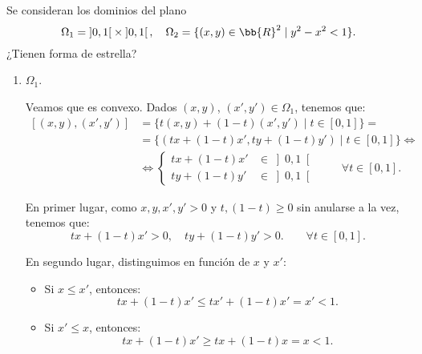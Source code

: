 \documentclass[12pt]{article}
\begin{document}
    \begin{ejercicio}
        Se consideran los dominios del plano
        \begin{equation*}
            \Omega_1 = \left]0, 1\right[ \times \left]0, 1\right[, \quad \Omega_2 = \{(x, y) \in \bb{R}^2 \mid y^2 - x^2 < 1\}.
        \end{equation*}
        ¿Tienen forma de estrella?
        \begin{enumerate}
            \item $\Omega_1$.
            
            Veamos que es convexo. Dados $(x, y)$, $(x', y') \in \Omega_1$, tenemos que:
            \begin{align*}
                \left[(x,y), (x',y')\right] &= \{t(x, y) +(1-t)(x',y') \mid t \in [0, 1]\}
                =\\&= \{(tx + (1-t)x', ty + (1-t)y') \mid t \in [0, 1]\}
                \Longleftrightarrow\\
                &\Longleftrightarrow \left\{
                \begin{aligned}
                    tx + (1-t)x' &\in \left]0, 1\right[\\
                    ty + (1-t)y' &\in \left]0, 1\right[
                \end{aligned}
                \right.\qquad \forall t \in [0, 1].
            \end{align*}

            En primer lugar, como $x,y,x',y'>0$ y $t,(1-t)\geq 0$ sin anularse a la vez, tenemos que:
            \begin{equation*}
                tx + (1-t)x' > 0, \quad ty + (1-t)y' > 0.\qquad \forall t \in [0, 1].
            \end{equation*}

            En segundo lugar, distinguimos en función de $x$ y $x'$:
            \begin{itemize}
                \item Si $x\leq x'$, entonces:
                \begin{equation*}
                    tx + (1-t)x'\leq tx' + (1-t)x' = x' < 1.
                \end{equation*}

                \item Si $x'\leq x$, entonces:
                \begin{equation*}
                    tx + (1-t)x'\geq tx + (1-t)x = x < 1.
                \end{equation*}
            \end{itemize}


\end{enumerate}
\end{ejercicio}
\end{document}
